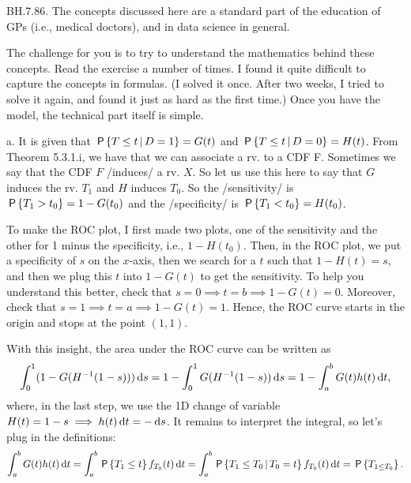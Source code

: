 \begin{exercise}
BH.7.86. The concepts discussed here are a standard part of the education of GPs (i.e., medical doctors), and in data science in general.
\begin{hint}
The challenge for you is to try to understand the mathematics behind these concepts.
Read the exercise a number of times. I found it quite difficult to capture the concepts in formulas. (I solved it once. After two weeks,  I tried to solve it again, and found it just as hard as the first time.) Once you have the model, the technical part itself is simple.
\end{hint}
\begin{solution}
a. It is given that $\P{T\leq t\given D=1} = G(t)$ and $\P{T\leq t\given D=0} = H(t)$. From Theorem 5.3.1.i,  we have that we can associate a rv. to a CDF F. Sometimes we say that the CDF $F$ /induces/ a rv. $X$.  So let us use this here to say that $G$ induces the rv. $T_1$ and $H$ induces $T_0$.
So the /sensitivity/ is $\P{T_1>t_0} = 1-G(t_0)$ and the /specificity/ is $\P{T_1<t_0} = H(t_0)$.

To make the ROC plot, I first made two plots, one of the sensitivity and the other for 1 minus the specificity, i.e., $1-H(t_0)$.
Then, in the ROC plot, we put a specificity of $s$ on the \(x\)-axis, then we search for a $t$ such that $1-H(t) = s$, and then we plug this $t$ into $1-G(t)$ to get the sensitivity.
To help you understand this better, check that $s=0 \implies t = b \implies 1-G(t) = 0$.
Moreover, check that $s=1\implies t=a \implies 1- G(t) = 1$.
Hence, the ROC curve starts in the origin and stops at the point $(1,1)$.

With this insight, the area under the ROC curve can be written as
\begin{align*}
\int_0^1 (1-G(H^{-1}(1-s))) \d s  =
1 - \int_0^1 G(H^{-1}(1-s)) \d s  =
1 - \int_a^b G(t) h(t) \d t,
\end{align*}
where, in the last step, we use the 1D change of variable $H(t)=1-s \implies h(t) \d t = -\d s$. It remains to  interpret the integral, so let's plug in the definitions:
\begin{align*}
\int_a^b G(t) h(t) \d t =
\int_a^b \P{T_1\leq t} f_{T_0}(t) \d t =
\int_a^b \P{T_1\leq T_0\given T_0 = t} f_{T_0}(t) \d t =  \P{T_{1\leq T_0}}.
\end{align*}

\end{solution}
\end{exercise}





